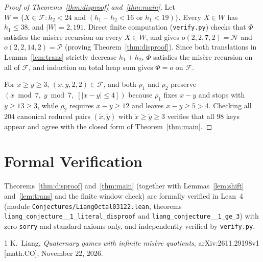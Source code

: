 \documentclass[11pt]{article}
\begin{document}
\begin{proof}[Proof of Theorems~\ref{thm:disproof} and~\ref{thm:main}]
Let $W = \{X \in \mathcal{F} : h_2 < 24 \text{ and } (h_1 - h_2 < 16 \text{ or } h_1 < 19)\}$. Every $X \in W$ has $h_1 \le 38$, and $|W| = 2{,}191$. Direct finite computation (\texttt{verify.py}) checks that $\Phi$ satisfies the mis\`{e}re recursion on every $X \in W$, and gives $o(2,2,7,2) = \mathcal{N}$ and $o(2,2,14,2) = \mathcal{P}$ (proving Theorem~\ref{thm:disproof}). Since both translations in Lemma~\ref{lem:trans} strictly decrease $h_1 + h_2$, $\Phi$ satisfies the mis\`{e}re recursion on all of $\mathcal{F}$, and induction on total heap sum gives $\Phi = o$ on $\mathcal{F}$.

For $x \ge y \ge 3$, $(x, y, 2, 2) \in \mathcal{F}$, and both $\rho_1$ and $\rho_2$ preserve $(x \bmod 7,\; y \bmod 7,\; [|x - y| \le 4])$ because $\rho_1$ fixes $x - y$ and stops with $y \ge 13 \ge 3$, while $\rho_2$ requires $x - y \ge 12$ and leaves $x - y \ge 5 > 4$. Checking all $204$ canonical reduced pairs $(\tilde{x}, \tilde{y})$ with $\tilde{x} \ge \tilde{y} \ge 3$ verifies that all $98$ keys appear and agree with the closed form of Theorem~\ref{thm:main}.
\end{proof}

\section*{Formal Verification}
Theorems~\ref{thm:disproof} and~\ref{thm:main} (together with Lemmas~\ref{lem:shift} and~\ref{lem:trans} and the finite window check) are formally verified in Lean~4 (module \texttt{Conjectures/\allowbreak LiangOctal03122.lean}, theorems \texttt{liang\_conjecture\_\_1\_\allowbreak literal\_\allowbreak disproof} and \texttt{liang\_conjecture\_\_1\_ge\_3}) with zero \texttt{sorry} and standard axioms only, and independently verified by \texttt{verify.py}.

\begin{thebibliography}{1}
K.~Liang, \emph{Quaternary games with infinite mis\`{e}re quotients}, arXiv:2611.29198v1 [math.CO], November 22, 2026.
\end{thebibliography}
\end{document}
